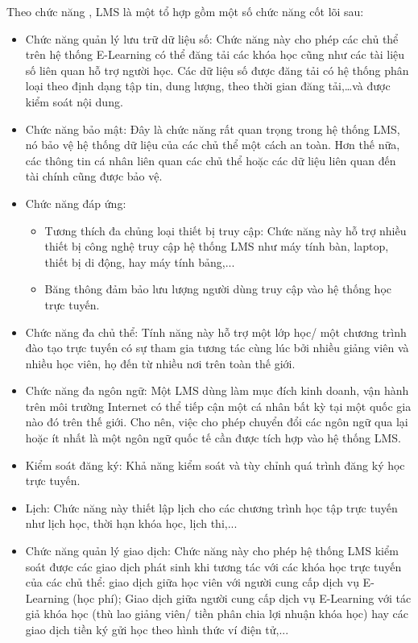 {Theo chức năng \cite{lms}, LMS là một tổ hợp gồm một số chức năng cốt lõi sau:}
\begin{itemize}
	\item Chức năng quản lý lưu trữ dữ liệu số: Chức năng này cho phép các chủ thể trên hệ thống E-Learning có thể đăng tải các khóa học cũng như các tài liệu số liên quan hỗ trợ người học. Các dữ liệu số được đăng tải có hệ thống phân loại theo định dạng tập tin, dung lượng, theo thời gian đăng tải,…và được kiểm soát nội dung.
	\item Chức năng bảo mật: Đây là chức năng rất quan trọng trong hệ thống LMS, nó bảo vệ hệ thống dữ liệu của các chủ thể một cách an toàn. Hơn thế nữa, các thông tin cá nhân liên quan các chủ thể hoặc các dữ liệu liên quan đến tài chính cũng được bảo vệ.
	\item Chức năng đáp ứng: 
	\begin{itemize}
		\item Tương thích đa chủng loại thiết bị truy cập: Chức năng này hỗ trợ nhiều thiết bị công nghệ truy cập hệ thống LMS như máy tính bàn, laptop, thiết bị di động, hay máy tính bảng,...
		\item Băng thông đảm bảo lưu lượng người dùng truy cập vào hệ thống học trực tuyến.
	\end{itemize}
	\item Chức năng đa chủ thể: Tính năng này hỗ trợ một lớp học/ một chương trình đào tạo trực tuyến có sự tham gia tương tác cùng lúc bởi nhiều giảng viên và nhiều học viên, họ đến từ nhiều nơi trên toàn thế giới.
	\item Chức năng đa ngôn ngữ: Một LMS dùng làm mục đích kinh doanh, vận hành trên môi trường Internet có thể tiếp cận một cá nhân bất kỳ tại một quốc gia nào đó trên thế giới. Cho nên, việc cho phép chuyển đổi các ngôn ngữ qua lại hoặc ít nhất là một ngôn ngữ quốc tế cần được tích hợp vào hệ thống LMS.
	\item Kiểm soát đăng ký: Khả năng kiểm soát và tùy chỉnh quá trình đăng ký học trực tuyến.
	\item Lịch: Chức năng này thiết lập lịch cho các chương trình học tập trực tuyến như lịch học, thời hạn khóa học, lịch thi,...
	\item Chức năng quản lý giao dịch: Chức năng này cho phép hệ thống LMS kiểm soát được các giao dịch phát sinh khi tương tác với các khóa học trực tuyến của các chủ thể: giao dịch giữa học viên với người cung cấp dịch vụ E-Learning (học phí); Giao dịch giữa người cung cấp dịch vụ E-Learning với tác giả khóa học (thù lao giảng viên/ tiền phân chia lợi nhuận khóa học) hay các giao dịch tiền ký gửi học theo hình thức ví điện tử,...

\end{itemize}
